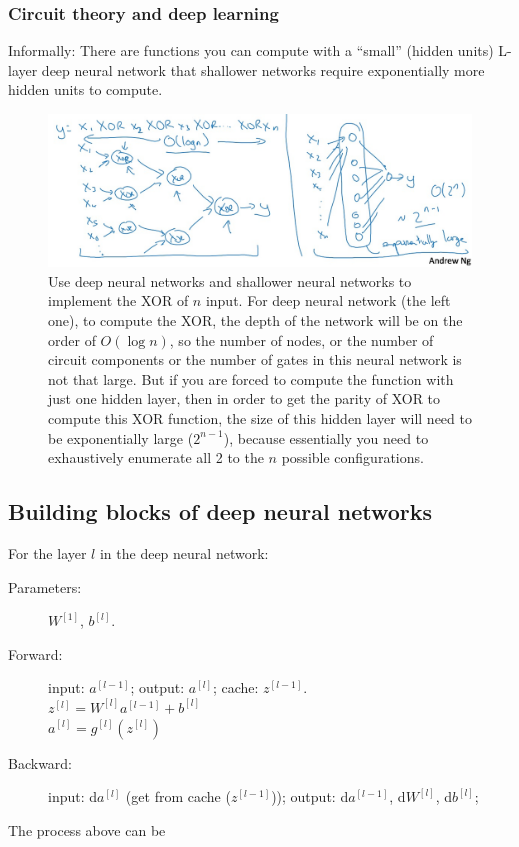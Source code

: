 \documentclass[UTF8]{article}
\newcommand{\Vector}[1]{\boldsymbol{\mathit{#1}}}   %
\newcommand{\Matrix}[1]{\boldsymbol{\mathit{#1}}}   %
\begin{document}
\subsubsection{Circuit theory and deep learning}
Informally: There are functions you can compute with a ``small'' (hidden units) L-layer deep neural
network that shallower networks require exponentially more hidden units to compute.

\begin{figure}[htb]
    \centering
    \includegraphics[width=40em]{figures/circuit-theory-and-dl}
    \caption{Use deep neural networks and shallower neural networks to implement the XOR of $n$
    input. For deep neural network (the left one), to compute the XOR, the depth of the network
    will be on the order of $O(\log n)$, so the number of nodes, or the number of circuit
    components or the number of gates in this neural network is not that large. But if you are
    forced to compute the function with just one hidden layer, then in order to get the parity
    of XOR to compute this XOR function, the size of this hidden layer will need to be exponentially
    large ($2^{n-1}$), because essentially you need to exhaustively enumerate all 2 to the $n$ possible
    configurations.}
    \label{circuit-theory-and-dl}
\end{figure}

\subsection{Building blocks of deep neural networks}
For the layer $l$ in the deep neural network:
\begin{description}
    \item[Parameters:] $\Matrix{W}^{[1]}$, $\Vector{b}^{[l]}$.
    \item[Forward:] input: $\Vector{a}^{[l-1]}$; output: $\Vector{a}^{[l]}$;
    cache: $\Vector{z^{[l-1]}}$. \\
    $\Vector{z}^{[l]} = \Matrix{W}^{[l]} \Vector{a}^{[l-1]} + \Vector{b}^{[l]}$ \\
    $\Vector{a}^{[l]} = g^{[l]}(\Vector{z}^{[l]})$
    \item[Backward:] input: d$\Vector{a}^{[l]}$ (get from cache ($\Vector{z^{[l-1]}}$));
    output: d$\Vector{a}^{[l-1]}$, d$\Matrix{W}^{[l]}$, d$\Vector{b}^{[l]}$;
\end{description}

The process above can be 
\end{document}
